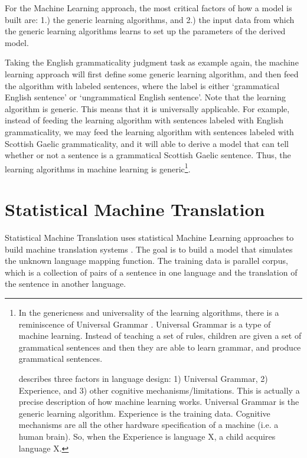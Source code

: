 \documentclass[final]{ua-thesis}
\numberwithin{equation}{section}
\begin{document}
For the Machine Learning approach, the most critical factors of how a model is built are: 1.) the generic learning algorithms, and 2.) the input data from which the generic learning algorithms learns to set up the parameters of the derived model.  

Taking the English grammaticality judgment task as example again, the machine learning approach will first define some generic learning algorithm, and then feed the algorithm with labeled sentences, where the label is either `grammatical English sentence' or `ungrammatical English sentence'. Note that the learning algorithm is generic. This means that it is universally applicable. For example, instead of feeding the learning algorithm with sentences labeled with English grammaticality, we may feed the learning algorithm with sentences labeled with Scottish Gaelic grammaticality, and it will able to derive a model that can tell whether or not a sentence is a grammatical Scottish Gaelic sentence. Thus, the learning algorithms in machine learning is generic\footnote{
In the genericness and universality of the learning algorithms, there is a reminiscence of Universal Grammar \citep{chomsky2007}. 
Universal Grammar is a type of machine learning. Instead of teaching a set of rules, children are given a set of grammatical sentences and then they are able to learn grammar, and produce grammatical sentences. 

\citet{chom2005_three_factors} describes three factors in language design: 1) Universal Grammar, 2) Experience, and 3) other cognitive mechanisms/limitations. This is actually a precise description of how machine learning works. Universal Grammar is the generic learning algorithm. Experience is the training data. Cognitive mechanisms are all the other hardware specification of a machine (i.e. a human brain). So, when the Experience is language X, a child acquires language X.}.  

  


\section{Statistical Machine Translation}
Statistical Machine Translation uses statistical Machine Learning approaches to build machine translation systems \citep{brown1988statistical, brown1990statistical, brown1993mathematics, koehn2009statistical, moses}. The goal is to build a model that simulates the unknown language mapping function. The training data is parallel corpus, which is a collection of pairs of a sentence in one language and the translation of the sentence in another language.
\end{document}
